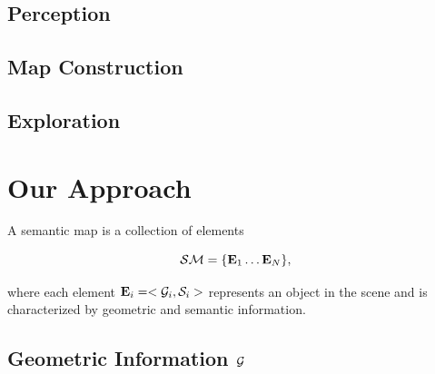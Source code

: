 \documentclass[letterpaper, 10 pt, conference]{ieeeconf}  %
\def\eqref#1{Eq.~(\ref{#1})}
\begin{document}
\subsection{Perception}

\subsection{Map Construction}

\subsection{Exploration}

\section{Our Approach}
\label{sec:main}

%
%
%
%

A semantic map is a collection of elements

\begin{equation}
\mathcal{SM} = \{ \mathbf{E}_1 \dots \mathbf{E}_N \},
\end{equation}

where each element $\mathbf{E}_i = < \mathcal{G}_i, \mathcal{S}_i>$ represents an object in the scene and is characterized by geometric and semantic information.

\subsection{Geometric Information $\mathcal{G}$}
\end{document}
